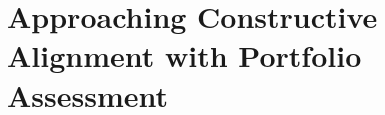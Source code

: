 
\chapter{Approaching Constructive Alignment with Portfolio Assessment} %
\label{cha:approaching_constructive_alignment_with_portfolio_assessment}

